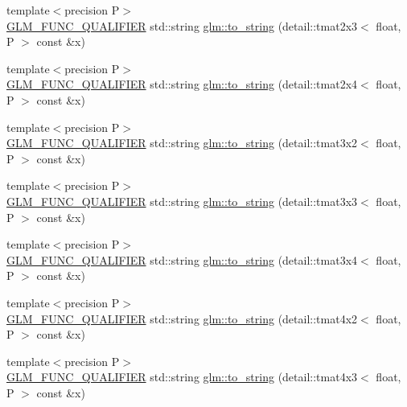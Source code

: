 \begin{DoxyCompactItemize}
\item 
{\footnotesize template$<$precision P$>$ }\\\hyperlink{setup_8hpp_a33fdea6f91c5f834105f7415e2a64407}{G\+L\+M\+\_\+\+F\+U\+N\+C\+\_\+\+Q\+U\+A\+L\+I\+F\+I\+ER} std\+::string \hyperlink{namespaceglm_ad89901ec5f12738b9a642525e49c8913}{glm\+::to\+\_\+string} (detail\+::tmat2x3$<$ float, P $>$ const \&x)
\item 
{\footnotesize template$<$precision P$>$ }\\\hyperlink{setup_8hpp_a33fdea6f91c5f834105f7415e2a64407}{G\+L\+M\+\_\+\+F\+U\+N\+C\+\_\+\+Q\+U\+A\+L\+I\+F\+I\+ER} std\+::string \hyperlink{namespaceglm_a615c6db6a316268f62953ebb73948003}{glm\+::to\+\_\+string} (detail\+::tmat2x4$<$ float, P $>$ const \&x)
\item 
{\footnotesize template$<$precision P$>$ }\\\hyperlink{setup_8hpp_a33fdea6f91c5f834105f7415e2a64407}{G\+L\+M\+\_\+\+F\+U\+N\+C\+\_\+\+Q\+U\+A\+L\+I\+F\+I\+ER} std\+::string \hyperlink{namespaceglm_a2f0a810251017c8150a5e3a3cffd6145}{glm\+::to\+\_\+string} (detail\+::tmat3x2$<$ float, P $>$ const \&x)
\item 
{\footnotesize template$<$precision P$>$ }\\\hyperlink{setup_8hpp_a33fdea6f91c5f834105f7415e2a64407}{G\+L\+M\+\_\+\+F\+U\+N\+C\+\_\+\+Q\+U\+A\+L\+I\+F\+I\+ER} std\+::string \hyperlink{namespaceglm_a928a5ae6ba9cce412e20c4cc82420df5}{glm\+::to\+\_\+string} (detail\+::tmat3x3$<$ float, P $>$ const \&x)
\item 
{\footnotesize template$<$precision P$>$ }\\\hyperlink{setup_8hpp_a33fdea6f91c5f834105f7415e2a64407}{G\+L\+M\+\_\+\+F\+U\+N\+C\+\_\+\+Q\+U\+A\+L\+I\+F\+I\+ER} std\+::string \hyperlink{namespaceglm_aaad0b48ed82b5b2cdddeb76e3789abd1}{glm\+::to\+\_\+string} (detail\+::tmat3x4$<$ float, P $>$ const \&x)
\item 
{\footnotesize template$<$precision P$>$ }\\\hyperlink{setup_8hpp_a33fdea6f91c5f834105f7415e2a64407}{G\+L\+M\+\_\+\+F\+U\+N\+C\+\_\+\+Q\+U\+A\+L\+I\+F\+I\+ER} std\+::string \hyperlink{namespaceglm_ad10393d7027f19f386ff2cf7fa24ccfd}{glm\+::to\+\_\+string} (detail\+::tmat4x2$<$ float, P $>$ const \&x)
\item 
{\footnotesize template$<$precision P$>$ }\\\hyperlink{setup_8hpp_a33fdea6f91c5f834105f7415e2a64407}{G\+L\+M\+\_\+\+F\+U\+N\+C\+\_\+\+Q\+U\+A\+L\+I\+F\+I\+ER} std\+::string \hyperlink{namespaceglm_aee13f0a6be949ae51bdc9488374b3182}{glm\+::to\+\_\+string} (detail\+::tmat4x3$<$ float, P $>$ const \&x)

\end{DoxyCompactItemize}
